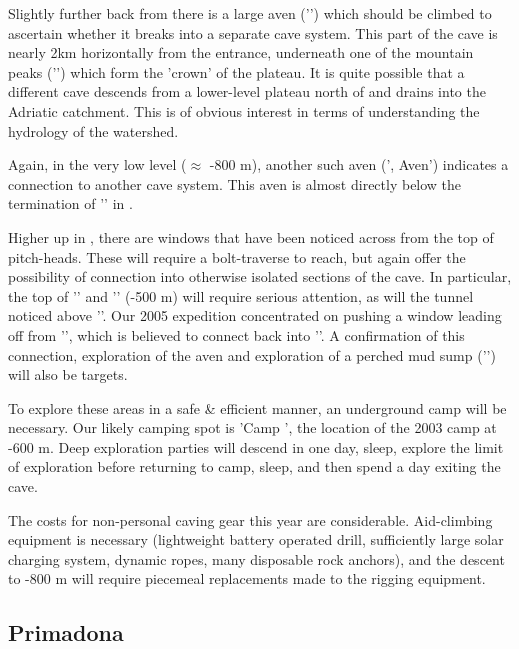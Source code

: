 Slightly further back from  there is a large aven ('') which should be climbed to ascertain whether it breaks into a separate cave system. This part of the cave is nearly 2km horizontally from the entrance, underneath one of the mountain peaks ('') which form the 'crown' of the plateau. It is quite possible that a different cave descends from a lower-level plateau north of  and drains into the Adriatic catchment. This is of obvious interest in terms of understanding the hydrology of the watershed.

Again, in the very low level ($\approx$ -800 m), another such aven (', Aven') indicates a connection to another cave system. This aven is almost directly below the termination of '' in .

Higher up in , there are windows that have been noticed across from the top of pitch-heads. These will require a bolt-traverse to reach, but again offer the possibility of connection into otherwise isolated sections of the cave. In particular, the top of '' and '' (-500 m) will require serious attention, as will the tunnel noticed above ''.
Our 2005 expedition concentrated on pushing a window leading off from '', which is believed to connect back into ''. A confirmation of this connection, exploration of the  aven and exploration of a perched mud sump ('') will also be targets.

To explore these areas in a safe \& efficient manner, an underground camp will be necessary. Our likely camping spot is 'Camp ', the location of the 2003 camp at -600 m. Deep exploration parties will descend in one day, sleep, explore the limit of exploration before returning to camp, sleep, and then spend a day exiting the cave.

The costs for non-personal caving gear this year are considerable. Aid-climbing equipment is necessary (lightweight battery operated drill, sufficiently large solar charging system, dynamic ropes, many disposable rock anchors), and the descent to -800 m will require piecemeal replacements made to the rigging equipment.

\subsection{Primadona}

